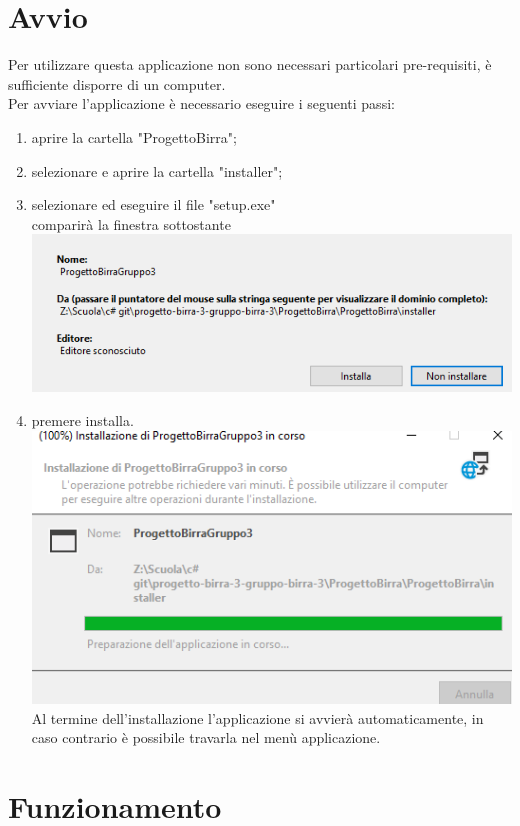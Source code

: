 \documentclass[a4paper, titlepage]{article}
\begin{document}
\section{Avvio}
Per utilizzare questa applicazione non sono necessari particolari pre-requisiti, è sufficiente disporre di un computer.\\
Per avviare l'applicazione è necessario eseguire i seguenti passi:
\begin{enumerate}
    \item aprire la cartella "ProgettoBirra";
    \item selezionare e aprire la cartella "installer";
    \item selezionare ed eseguire il file "setup.exe"\\
    comparirà la finestra sottostante\\
    \includegraphics[scale=0.30]{Immagini/imgpsh_fullsize_anim.png}
    \item premere installa.\\
    \includegraphics[scale=0.30]{Immagini/imgpsh_fullsize_anim (1).png}\\
    Al termine dell'installazione l'applicazione si avvierà automaticamente, in caso contrario è possibile travarla nel menù applicazione.
\end{enumerate}

\section{Funzionamento}
\end{document}
